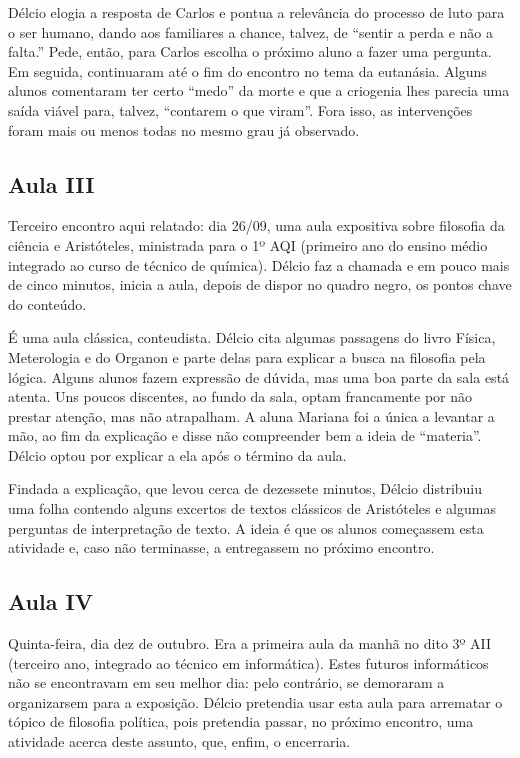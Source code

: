 \documentclass[12pt,a4paper]{article}
\begin{document}
    Délcio elogia a resposta de Carlos e pontua a relevância do processo de 
    luto para o ser humano, dando aos familiares a chance, talvez, de 
    ``sentir a perda e não a falta.'' Pede, então, para Carlos escolha o próximo 
    aluno  a fazer uma pergunta. Em seguida, continuaram até o fim do 
    encontro no tema da eutanásia. Alguns alunos comentaram ter certo ``medo'' 
    da morte e que a criogenia lhes parecia uma saída viável para, talvez, 
    ``contarem o que viram''. Fora isso, as intervenções foram mais ou menos 
    todas no mesmo grau já observado. 
    
    \subsection*{Aula III}
    
    Terceiro encontro aqui relatado: dia 26/09, uma aula expositiva sobre 
    filosofia da ciência e Aristóteles, ministrada para o 1º AQI (primeiro ano
    do ensino médio integrado ao curso de técnico de química). Délcio faz a 
    chamada e em pouco mais de cinco minutos, inicia a aula, depois de dispor 
    no quadro negro, os pontos chave do conteúdo. 
    
    É uma aula clássica, conteudista. Délcio cita algumas passagens do livro 
    Física, Meterologia e do Organon e parte delas para explicar a busca na 
    filosofia pela lógica. Alguns alunos fazem expressão de dúvida, mas uma boa 
    parte da sala está atenta. Uns poucos discentes, ao fundo da sala, 
    optam francamente por não prestar atenção, mas não atrapalham. A aluna 
    Mariana foi a única a levantar a mão, ao fim da explicação e disse não 
    compreender bem a ideia de ``materia''. Délcio optou por explicar a ela 
    após o término da aula. 
    
    Findada a explicação, que levou cerca de dezessete minutos, Délcio 
    distribuiu uma folha contendo alguns excertos de textos clássicos de 
    Aristóteles e algumas perguntas de interpretação de texto. A ideia é que 
    os alunos começassem esta atividade e, caso não terminasse, a entregassem 
    no próximo encontro. 
    
    \subsection*{Aula IV}

	Quinta-feira, dia dez de outubro. Era a primeira aula da manhã no dito 3º 
	AII (terceiro ano, integrado ao técnico em informática). Estes futuros 
	informáticos não se encontravam em seu melhor dia: pelo contrário, se 
	demoraram a organizarsem para a exposição. Délcio pretendia usar esta aula 
	para arrematar o tópico de filosofia política, pois pretendia passar, no 
	próximo encontro, uma atividade acerca deste assunto, que, enfim, o 
	encerraria. 
	
\end{document}
